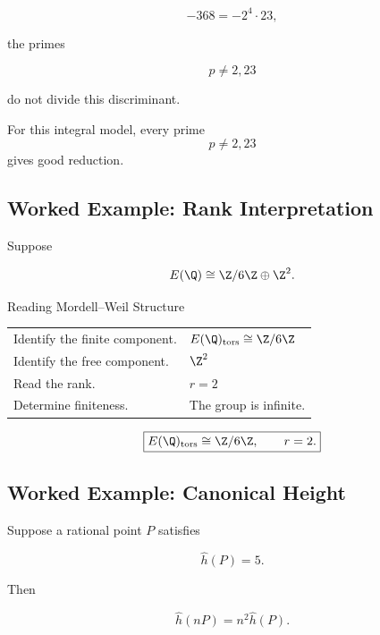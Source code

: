 \[ -368=-2^4\cdot23, \]

the primes

\[ p\neq2,23 \]

do not divide this discriminant.

\begin{answerbox}
For this integral model, every prime
\[ \boxed{p\neq2,23} \]
gives good reduction.
\end{answerbox}

\subsection{Worked Example: Rank Interpretation}
\label{subsec:worked-rank-interpretation}

Suppose

\[ E(\Q)\cong\Z/6\Z\oplus\Z^2. \]

\begin{workedexamplebox}{Reading Mordell--Weil Structure}

\begin{tabularx}{\textwidth}{@{}>{\raggedright\arraybackslash}p{}X@{}}
Identify the finite component. & \(E(\Q)_{\mathrm{tors}}\cong\Z/6\Z\)\\
Identify the free component. & \(\Z^2\)\\
Read the rank. & \(r=2\)\\
Determine finiteness. & The group is infinite.
\end{tabularx}

\begin{answerbox}
\[ \boxed{E(\Q)_{\mathrm{tors}}\cong\Z/6\Z,\qquad r=2.} \]
\end{answerbox}
\end{workedexamplebox}

\subsection{Worked Example: Canonical Height}
\label{subsec:worked-canonical-height}

Suppose a rational point \(P\) satisfies

\[ \hat h(P)=5. \]

Then

\[ \hat h(nP)=n^2\hat h(P). \]

